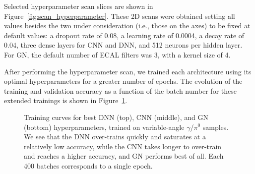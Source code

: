 \begin{figure*}[htbp]
\centering
\caption{Selected hyperparameter scan results for DNN (top), CNN (center), and GN (bottom). In each figure, the classification accuracy is displayed as a function of the hyperparameters reported on the two axes.}
\label{fig:scan_hyperparameter}
\end{figure*}

Selected hyperparameter scan slices are shown in Figure~\ref{fig:scan_hyperparameter}. 
These 2D scans were obtained setting all values besides the two under consideration (i.e., those on the axes) to be fixed at default values: a dropout rate of 0.08, a learning rate of 0.0004, a decay rate of 0.04, three dense layers for CNN and DNN, and 512 neurons per hidden layer. For GN, the default number of ECAL filters was 3, with a kernel size of 4.

After performing the hyperparameter scan, we trained each architecture using its optimal hyperparameters for a greater number of epochs. The evolution of the training and validation accuracy as a function of the batch number for these extended trainings is shown in Figure~\ref{fig:training_curves_comparison_gamma_pi0}.

\begin{figure}[htbp]
\centering
\caption{Training curves for best DNN (top), CNN (middle), and GN (bottom) hyperparameters, trained on variable-angle $\gamma$/$\pi^0$ samples. We see that the DNN over-trains quickly and saturates at a relatively low accuracy, while the CNN takes longer to over-train and reaches a higher accuracy, and GN performs best of all. Each 400 batches corresponds to a single epoch.}
\label{fig:training_curves_comparison_gamma_pi0}
\end{figure}

